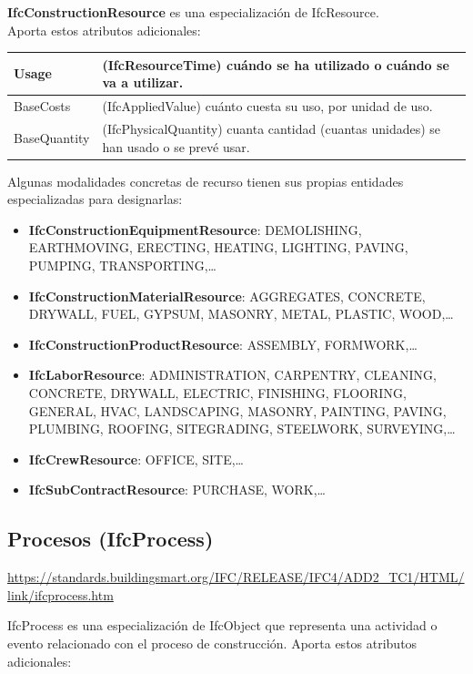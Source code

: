 \documentclass[spanish,12pt,a4paper,final,oneside]{book}
\begin{document}
\textbf{IfcConstructionResource} es una especialización de IfcResource.
\\Aporta estos atributos adicionales:
\\ \begin{longtable}{|p{2.5cm} p{11cm}|}
\hline

Usage & (IfcResourceTime) cuándo se ha utilizado o cuándo se va a utilizar.
\\[0.1cm] \hline

BaseCosts & (IfcAppliedValue) cuánto cuesta su uso, por unidad de uso.
\\[0.1cm] \hline

BaseQuantity & (IfcPhysicalQuantity) cuanta cantidad (cuantas unidades) se han usado o se prevé usar.
\\[0.1cm] \hline

\end{longtable}

\vspace{0.3cm}
Algunas modalidades concretas de recurso tienen sus propias entidades especializadas para designarlas:
\begin{itemize}
\item \textbf{IfcConstructionEquipmentResource}: DEMOLISHING, EARTHMOVING, ERECTING, HEATING, LIGHTING, PAVING, PUMPING, TRANSPORTING,\ldots 
\item \textbf{IfcConstructionMaterialResource}: AGGREGATES, CONCRETE, DRYWALL, FUEL, GYPSUM, MASONRY, METAL, PLASTIC, WOOD,\ldots
\item \textbf{IfcConstructionProductResource}: ASSEMBLY, FORMWORK,\ldots
\item \textbf{IfcLaborResource}: ADMINISTRATION, CARPENTRY, CLEANING, CONCRETE, DRYWALL, ELECTRIC, FINISHING, FLOORING, GENERAL, HVAC, LANDSCAPING, MASONRY, PAINTING, PAVING, PLUMBING, ROOFING, SITEGRADING, STEELWORK, SURVEYING,\ldots
\item \textbf{IfcCrewResource}: OFFICE, SITE,\ldots 
\item \textbf{IfcSubContractResource}: PURCHASE, WORK,\ldots
\end{itemize}



\subsection{Procesos (IfcProcess)}
\url{https://standards.buildingsmart.org/IFC/RELEASE/IFC4/ADD2_TC1/HTML/link/ifcprocess.htm}

IfcProcess es una especialización de IfcObject que representa una actividad o evento relacionado con el proceso de construcción. Aporta estos atributos adicionales:
\end{document}
